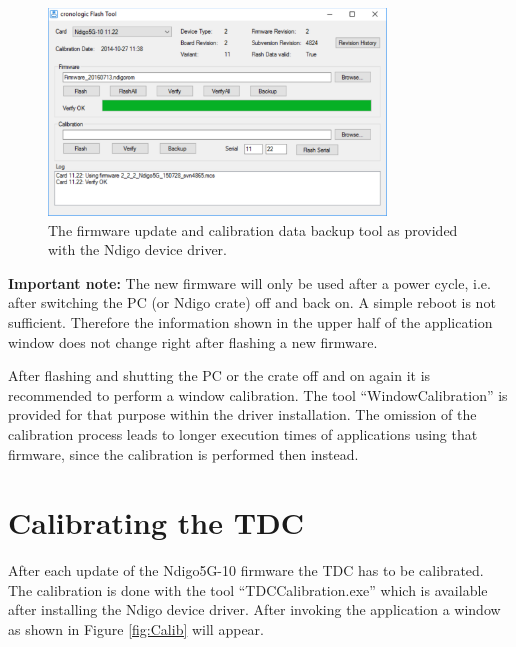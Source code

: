 		\begin{figure}[ht]
			\begin{center}
				\includegraphics[width=0.8\textwidth]{figures/Firmware.pdf}
				\caption{\label{fig:Firmware}The firmware update and calibration data backup tool as provided with the Ndigo device driver.}
			\end{center}
		\end{figure}

\textbf{Important note:} The new firmware will only be used after a power cycle, i.e. after switching the PC (or Ndigo crate) off and back on. A simple reboot is not sufficient. Therefore the information shown in the upper half of the application window does not change right after flashing a new firmware.\par
After flashing and shutting the PC or the crate off and on again it is recommended to perform a window calibration. The tool ``WindowCalibration'' is provided for that purpose within the driver installation. The omission of the calibration process leads to longer execution times of applications using that firmware, since the calibration is performed then instead.
	
	\section{Calibrating the TDC}
	
		After each update of the Ndigo5G-10 firmware the TDC has to be calibrated. The calibration is done with the tool ``TDC\tu Calibration.exe'' which is available after installing the Ndigo device driver. After invoking the application a window as shown in Figure \ref{fig:Calib} will appear.\par

